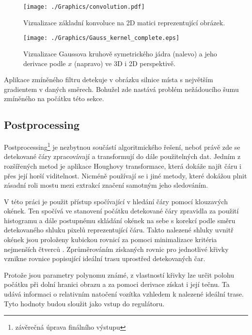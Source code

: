 \documentclass[czech, bc, kky, he, iso690numb]{fasthesis}
\begin{document}
	                \begin{figure}[ht]
	                    \centering
	                    \texttt{[image: ./Graphics/convolution.pdf]}
	                    \caption{Vizualizace základní konvoluce na 2D matici reprezentující obrázek.}
	                    \label{pic:convolution}
	                \end{figure}
                
                	\begin{figure}[ht]
                		\centering
                		\texttt{[image: ./Graphics/Gauss\_kernel\_complete.eps]}
                		\caption{Vizualizace Gaussova kruhově symetrického jádra (nalevo) a jeho derivace podle \(x\) (napravo) ve 3D i 2D perspektivě.}
                		\label{pic:Gauss_kernel}
                	\end{figure}
                
                Aplikace zmíněného filtru detekuje v obrázku silnice místa s největším gradientem v daných směrech. Bohužel zde nastává problém nežádoucího šumu zmíněného na počátku této sekce.
                
            \subsection{Postprocessing}\label{chap:01_postprocessing}
                Postprocessing\footnote{závěrečná úprava finálního výstupu} je nezbytnou součástí algoritmického řešení, neboť právě zde se detekované čáry zpracovávají a transformují do dále použitelných dat. Jedním z rozšířených metod je aplikace Houghovy transformace, která dokáže najít čáru i přes její horší viditelnost. Nicméně používají se i jiné metody, které dokážou plnit zásadní roli mostu mezi extrakcí značení samotným jeho sledováním.
                
                V této práci je použit přístup spočívající v hledání čáry pomocí klouzavých okének. Ten spočívá ve stanovení počátku detekované čáry zpravidla za použití histogramu a dále postupnému skládání okének na sebe s korekcí podle směru detekovaného shluku pixelů reprezentující čáru. Takto nalezené shluky uvnitř okének jsou proloženy kubickou rovnicí za pomoci minimalizace kritéria nejmenších čtverců \cite{polyfit}. Zprůměrováním získaných rovnic pro jednotlivé křivky vznikne rovnice popisující ideální trasu uprostřed detekovaných čar.
                
                Protože jsou parametry polynomu známé, z vlastností křivky lze určit polohu počátku při dolní hranici obrazu a za pomoci derivace získat i její tečnu. Ta udává informaci o relativním natočení vozítka vzhledem k nalezené ideální trase. Tyto hodnoty budou sloužit jako vstup do regulátoru.
                
\end{document}
